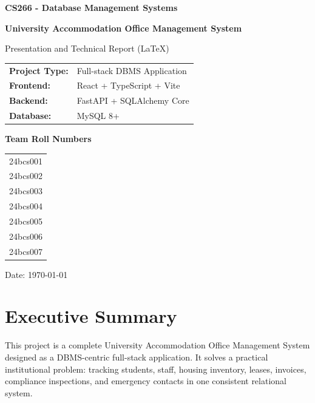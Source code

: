 \documentclass[11pt,a4paper]{article}
\begin{document}
\begin{titlepage}
\centering
\vspace*{1.2cm}

{\LARGE\bfseries CS266 - Database Management Systems\par}
\vspace{0.6cm}
{\Large\bfseries University Accommodation Office Management System\par}
\vspace{0.4cm}
{\large Presentation and Technical Report (LaTeX)\par}

\vspace{1.0cm}

\begin{tabular}{ll}
\textbf{Project Type:} & Full-stack DBMS Application \\
\textbf{Frontend:} & React + TypeScript + Vite \\
\textbf{Backend:} & FastAPI + SQLAlchemy Core \\
\textbf{Database:} & MySQL 8+ \\
\end{tabular}

\vspace{1.2cm}

{\large\bfseries Team Roll Numbers\par}
\vspace{0.4cm}
\begin{tabular}{c}
24bcs001 \\
24bcs002 \\
24bcs003 \\
24bcs004 \\
24bcs005 \\
24bcs006 \\
24bcs007 \\
\end{tabular}

\vspace{1.4cm}

{\large Date: \today\par}

\vfill
\end{titlepage}

\tableofcontents
\newpage

\section{Executive Summary}
This project is a complete University Accommodation Office Management System designed as a DBMS-centric full-stack application. It solves a practical institutional problem: tracking students, staff, housing inventory, leases, invoices, compliance inspections, and emergency contacts in one consistent relational system.
\end{document}
